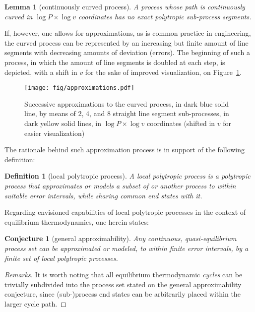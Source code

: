 \documentclass[fleqn,11pt]{SelfArx}
\newtheorem{definition}{Definition}
\newtheorem{lemma}{Lemma}
\newtheorem{conjecture}{Conjecture}
\begin{document}
    \begin{lemma}[continuously curved process]\label{lemm:curved.proc}
        A process whose path is continuously curved in $\log P \times \log v$ coordinates has no
        exact polytropic sub-process segments.
    \end{lemma}

    If, however, one allows for approximations, as is common practice in engineering, the curved
    process can be represented by  an  increasing  but  finite  amount  of  line  segments  with
    decreasing amounts of deviation (errors). The beginning of such  a  process,  in  which  the
    amount of line segments is doubled at each step, is depicted, with a shift in  $v$  for  the
    sake of improved visualization, on Figure~\ref{fig:approx}.

    \begin{figure}[ht]
        \centering
        \texttt{[image: fig/approximations.pdf]}
        \caption{Successive approximations to the curved process, in dark blue  solid  line,  by
            means of 2, 4, and 8 straight line  segment  sub-processes,  in  dark  yellow  solid
            lines,  in  $\log  P  \times  \log  v$  coordinates  (shifted  in  $v$  for   easier
            visualization)}
        \label{fig:approx}
    \end{figure}

    The rationale behind such approximation process is in support of the following definition:

    \begin{definition}[local polytropic process]\label{def:local.polytropic}
        A local polytropic process is a polytropic process that approximates or models a  subset
        of or another process to within suitable  error  intervals,  while  sharing  common  end
        states with it.
    \end{definition}

    Regarding  envisioned  capabilities  of  local  polytropic  processes  in  the  context   of
    equilibrium thermodynamics, one herein states:

    \begin{conjecture}[general approximability]\label{conj:gen.approx}
        Any continuous, quasi-equilibrium process set can be approximated or modeled, to  within
        finite error intervals, by a finite set of local polytropic processes.
    \end{conjecture}

    \begin{proof}[Remarks]
        It is worth noting that all equilibrium thermodynamic  \emph{cycles}  can  be  trivially
        subdivided into the process set stated on the general approximability conjecture,  since
        (sub-)process end states can be arbitrarily placed within the larger cycle path.
    \end{proof}
\end{document}

